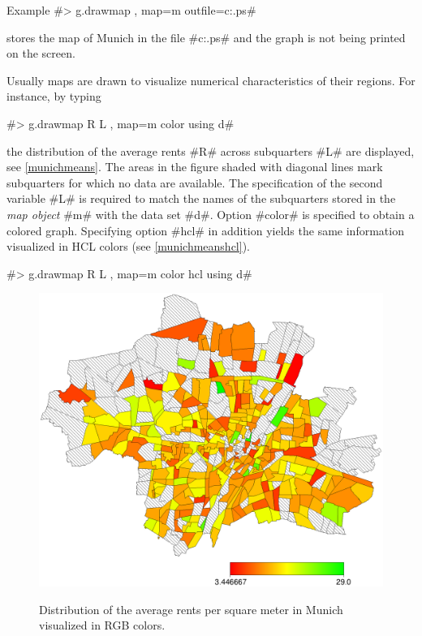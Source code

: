 \begin{stanza}{Example}
#> g.drawmap , map=m outfile=c:\temp\munich.ps#

stores the map of Munich in the file
#c:\temp\munich.ps# and the graph is not
being printed on the screen.

Usually maps are drawn to visualize numerical characteristics of
their regions. For instance,
by typing

#> g.drawmap R L , map=m color using d#

the distribution of the average rents #R# across subquarters #L# are
displayed, see \autoref{munichmeans}. The areas in the figure shaded
with diagonal lines mark subquarters for which  no data are
available. The specification of the second variable #L# is required
to match the names of the subquarters stored in the {\em map object}
#m# with the data set #d#. Option #color# is specified to obtain a
colored graph. Specifying option #hcl# in addition yields the same
information visualized in HCL colors (see \autoref{munichmeanshcl}).

#> g.drawmap R L , map=m color hcl using d#

\end{stanza}

\begin{figure}[htb]
\begin{center}
\includegraphics[scale=0.5]{grafiken/munichmeansdrawmap.ps}
{\em\caption{ \label{munichmeans} Distribution of the average rents
per square meter in Munich visualized in RGB colors.}}
\end{center}
\end{figure}

